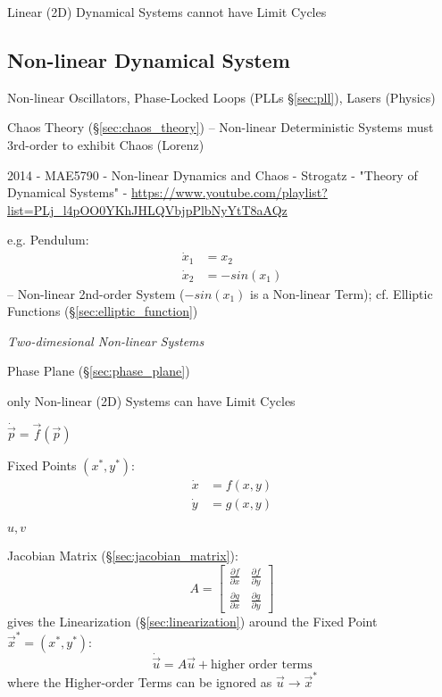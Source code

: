 Linear (2D) Dynamical Systems cannot have Limit Cycles



\subsection{Non-linear Dynamical System}\label{sec:nonlinear_dynamical_system}

Non-linear Oscillators, Phase-Locked Loops (PLLs \S\ref{sec:pll}), Lasers
(Physics)

\fist Chaos Theory (\S\ref{sec:chaos_theory}) -- Non-linear Deterministic
Systems must 3rd-order to exhibit Chaos (Lorenz)

2014 - MAE5790 - Non-linear Dynamics and Chaos - Strogatz - "Theory of
Dynamical Systems" -
\url{https://www.youtube.com/playlist?list=PLj_l4pOO0YKhJHLQVbjpPlbNyYtT8aAQz}

e.g. Pendulum:
\begin{align*}
  \dot{x}_1 & = x_2 \\
  \dot{x}_2 & = -sin(x_1)
\end{align*}
-- Non-linear 2nd-order System ($-sin(x_1)$ is a Non-linear Term); cf. Elliptic
Functions
(\S\ref{sec:elliptic_function})

\emph{Two-dimesional Non-linear Systems}

\fist Phase Plane (\S\ref{sec:phase_plane})

only Non-linear (2D) Systems can have Limit Cycles

$\dot{\vec{p}} = \vec{f}(\vec{p})$

Fixed Points $(x^*,y^*)$:
\begin{align*}
  \dot{x} & = f(x,y) \\
  \dot{y} & = g(x,y)
\end{align*}

$u, v$

Jacobian Matrix (\S\ref{sec:jacobian_matrix}):
\[
  A = \begin{bmatrix}
    \frac{\partial{f}}{\partial{x}} & \frac{\partial{f}}{\partial{y}} \\
    \frac{\partial{g}}{\partial{x}} & \frac{\partial{g}}{\partial{y}}
  \end{bmatrix}
\]
gives the Linearization (\S\ref{sec:linearization}) around the Fixed
Point $\vec{x}^* = (x^*, y^*)$:
\[
  \dot{\vec{u}} = A \vec{u} + \text{higher order terms}
\]
where the Higher-order Terms can be ignored as $\vec{u} \rightarrow \vec{x}^*$

